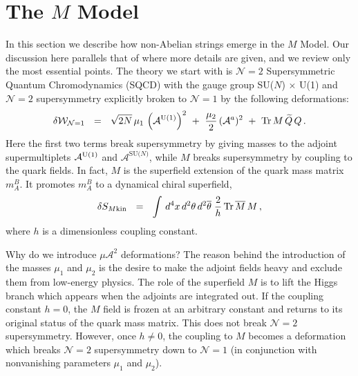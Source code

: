 \documentclass[12pt]{article}
\def\beq{\begin{equation}}
\def\eeq{\end{equation}}
\def\Tr{{\rm Tr}}
\newcommand{\ntwo}{${\mathcal N}=2$ }
\newcommand{\none}{${\mathcal N}=1$ }
\newcommand{\wt}{\widetilde}
\newcommand{\ov}{\overline}
\newcommand{\mc}[1]{\mathcal{#1}}
\newcommand{\sunu}{{\rm SU($N$) $\times$ U(1) }}
\begin{document}



%
%


%
%
\section{The {\boldmath $M$} Model}
\setcounter{equation}{0}

In this section we describe how non-Abelian strings emerge in the $M$ Model.
Our discussion here parallels that of \cite{GSYmmodel} where more details are
given, and we review only the most essential points.
The theory we start with is  \ntwo Supersymmetric Quantum Chromodynamics (SQCD) 
with the gauge group \sunu  and \ntwo supersymmetry
explicitly broken to \none by the following deformations:
\beq
\label{none}
	\delta\mc{W}_{\mc{N}=1} ~~=~~ \sqrt{2N}\,\mu_1\, \left( \mc{A}^{\rm U(1)} \right)^2 
				~+~ \frac{\mu_2}{2}\, (\mc{A}^a)^2
				~+~ \Tr\, M\, \wt{Q}\, Q\,.
\eeq
Here the first two terms break supersymmetry by giving masses to the adjoint 
supermultiplets $ \mc{A}^{\rm U(1)} $ and $ \mc{A}^\text{SU($N$)} $, 
while $ M $ breaks supersymmetry by coupling to the quark fields. In fact,
$ M $ is the superfield extension of the quark mass matrix $ m_A^B $. It promotes 
$ m_A^B $ to a dynamical chiral superfield,
\[
	\delta S_{M \rm kin} ~~=~~ \int\, d^4x\, d^2\theta\, d^2\ov{\theta} \;
					\frac{2}{h}\, \Tr\, \ov{M}\, M \,,
\]
where $ h $ is a dimensionless coupling constant. 

\vspace{1mm}

Why do we introduce $\mu{\mathcal A}^2$ deformations?
The reason behind the introduction of the masses $ \mu_1 $ and $ \mu_2 $ is 
the desire to make the adjoint fields
heavy and exclude them from low-energy physics.
The role of the superfield $ M $ is to lift the Higgs branch which appears when
the adjoints are integrated out. If the coupling constant $h=0$, the $M$ field is frozen at an arbitrary  constant 
and returns to its original status  of the quark mass matrix. This does not break \ntwo supersymmetry. However,
once $h\neq 0$, the coupling to $M$ becomes a deformation which breaks \ntwo supersymmetry
down to \none (in conjunction  with nonvanishing parameters $\mu_1$ and $\mu_2$).
\end{document}

